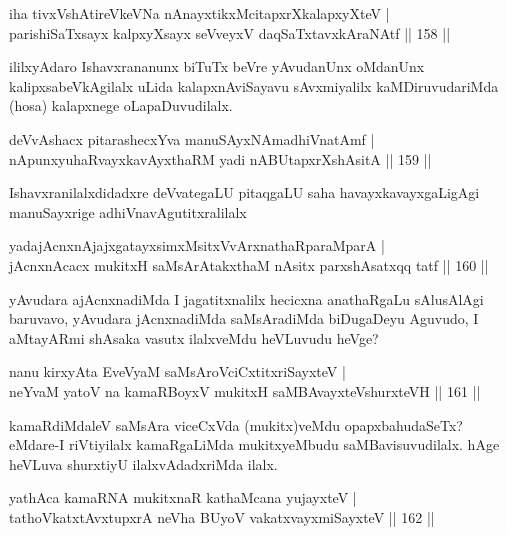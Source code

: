 \begin{shl}
iha tivxVshAtireVkeVNa nAnayxtikxMcitapxrXkalapxyXteV |\\
parishiSaTxsayx kalpxyXsayx seVveyxV daqSaTxtavxkAraNAtf \hfill || 158 ||
\end{shl}

\begin{artha}
ililxyAdaro Ishavxrananunx biTuTx beVre yAvudanUnx oMdanUnx kalipxsabeVkAgilalx uLida kalapxnAviSayavu sAvxmiyalilx kaMDiruvudariMda (hosa) kalapxnege oLapaDuvudilalx.
\end{artha}

\begin{shl}
deVvAshacx pitarashecxYva manuSAyxNAmadhiVnatAmf |\\
nA\s \s punxyuhaRvayxkavAyxthaRM yadi nABUtapxrXshAsitA \hfill || 159 ||
\end{shl}

\begin{artha}
Ishavxranilalxdidadxre deVvategaLU pitaqgaLU saha havayxkavayxgaLigAgi manuSayxrige adhiVnavAgutitxralilalx
\end{artha}

\begin{shl}
yadajAcnxnAjajxgatayxsimxMsitxVvArxnathaRparaMparA |\\
jAcnxnAcacx mukitxH saMsArAtakxthaM nAsitx parxshAsatxqq tatf \hfill || 160 ||
\end{shl}

\begin{artha}
yAvudara ajAcnxnadiMda I jagatitxnalilx hecicxna anathaRgaLu sAlusAlAgi baruvavo, yAvudara jAcnxnadiMda saMsAradiMda biDugaDeyu Aguvudo, I aMtayARmi shAsaka vasutx ilalxveMdu heVLuvudu heVge?
\end{artha}


\begin{shl}
nanu kirxyAta EveVyaM saMsAroVciCxtitxriSayxteV |\\
neYvaM yatoV na kamaRBoyxV mukitxH saMBAvayxteV\s shurxteVH \hfill || 161 ||
\end{shl}

\begin{artha}
kamaRdiMdaleV saMsAra viceCxVda (mukitx)veMdu opapxbahudaSeTx? eMdare-I riVtiyilalx kamaRgaLiMda mukitxyeMbudu saMBavisuvudilalx. hAge heVLuva shurxtiyU ilalxvAdadxriMda ilalx.
\end{artha}

\begin{shl}
yathAca kamaRNA mukitxnaR kathaMcana yujayxteV |\\
tathoVkatxtAvxtupxrA neVha BUyoV vakatxvayxmiSayxteV \hfill || 162 ||
\end{shl}

